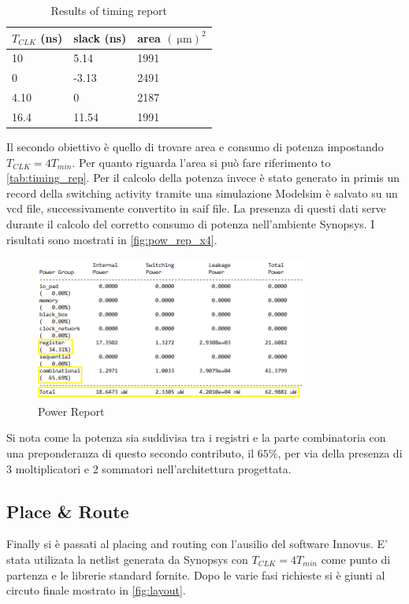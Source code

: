 \begin{table}[h]
\begin{center}
\begin{tabular}{|l|l|l|}
\hline
$T_{CLK}$ (ns) & slack (ns) & area $(\SI{}{\micro\meter})^2$ \\
\hline
10 & 5.14 & 1991 \\
0 & -3.13 & 2491 \\
4.10 & 0 & 2187 \\
16.4 & 11.54 & 1991 \\
\hline
\end{tabular}
\end{center}
\caption{Results of timing report}
\label{tab:timing_rep}
\end{table}

Il secondo obiettivo è quello di trovare area e consumo di potenza impostando $T_{CLK} = 4 T_{min}$. Per quanto riguarda l'area si può fare riferimento to \autoref{tab:timing_rep}. Per il calcolo della potenza invece è stato generato in primis un record della switching activity tramite una simulazione Modelsim è salvato su un vcd file, successivamente convertito in saif file. La presenza di questi dati serve durante il calcolo del corretto consumo di potenza nell'ambiente Synopsys. I risultati sono mostrati in \autoref{fig:pow_rep_x4}.

\begin{figure}[h]
	\center
	\includegraphics[width=0.8\textwidth]{images/rep_power_x4_mod.png}
	\caption{Power Report}
	\label{fig:pow_rep_x4}
\end{figure}

Si nota come la potenza sia suddivisa tra i registri e la parte combinatoria con una preponderanza di questo secondo contributo, il $65\%$, per via della presenza di 3 moltiplicatori e 2 sommatori nell'architettura progettata.

\subsection{Place \& Route}
Finally si è passati al placing and routing con l'ausilio del software Innovus. E' stata utilizata la netlist generata da Synopsys con $T_{CLK} = 4 T_{min}$ come punto di partenza e le librerie standard fornite. Dopo le varie fasi richieste si è giunti al circuto finale mostrato in \autoref{fig:layout}.

